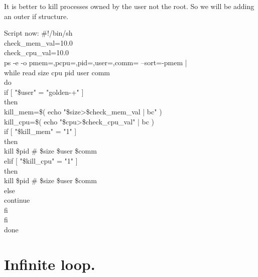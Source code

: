 \documentclass[12pt,a4paper]{article}
\begin{document}
It is better to kill processes owned by the user not the root. So we will be adding an outer if structure.\\
\begin{flushleft}
Script now:
\newline
\#!/bin/sh\\
check\_mem\_val=10.0\\
check\_cpu\_val=10.0\\
ps -e -o pmem=,pcpu=,pid=,user=,comm= --sort=-pmem |\\
  while read size cpu pid user comm\\
  do\\
if [ "\$user" = "golden-+" ]\\
    then\\
kill\_mem=\$( echo "\$size>\$check\_mem\_val | bc" )\\
kill\_cpu=\$( echo "\$cpu>\$check\_cpu\_val" | bc )\\
 if [ "\$kill\_mem" = "1" ]\\
      then\\
        kill \$pid \# \$size \$user \$comm\\
      elif [ "\$kill\_cpu" = "1" ]\\
      then\\
        kill \$pid \# \$size \$user \$comm\\
      else\\
        continue\\
      fi\\
fi\\
  done\\
\end{flushleft}
\newpage
\section{Infinite loop.}
\end{document}
